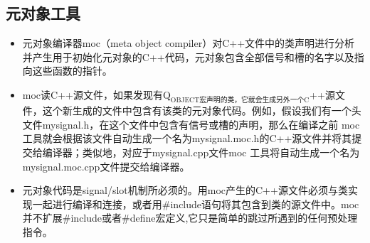 \documentclass[9pt,b5paper]{article}
\begin{document}
\subsection{元对象工具}
\label{sec-1-5}
\begin{itemize}
\item 元对象编译器moc（meta object compiler）对C++文件中的类声明进行分析并产生用于初始化元对象的C++代码，元对象包含全部信号和槽的名字以及指向这些函数的指针。
\item moc读C++源文件，如果发现有Q$_{\text{OBJECT宏声明的类，它就会生成另外一个C}}$++源文件，这个新生成的文件中包含有该类的元对象代码。例如，假设我们有一个头文件mysignal.h，在这个文件中包含有信号或槽的声明，那么在编译之前 moc 工具就会根据该文件自动生成一个名为mysignal.moc.h的C++源文件并将其提交给编译器；类似地，对应于mysignal.cpp文件moc 工具将自动生成一个名为mysignal.moc.cpp文件提交给编译器。
\item 元对象代码是signal/slot机制所必须的。用moc产生的C++源文件必须与类实现一起进行编译和连接，或者用\#include语句将其包含到类的源文件中。moc并不扩展\#include或者\#define宏定义,它只是简单的跳过所遇到的任何预处理指令。
\end{itemize}
\end{document}
